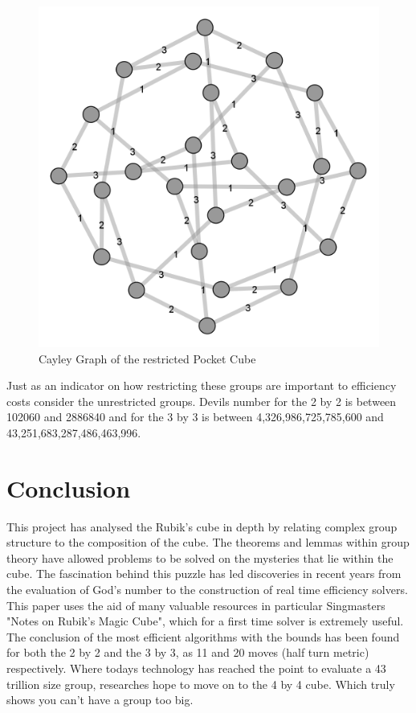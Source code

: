 \documentclass{article}
\newcounter{theo}[section]\setcounter{theo}{0}
\newcounter{lem}[section]\setcounter{lem}{0}
\begin{document}
\begin{figure}[h]
\includegraphics[scale=.15]{DoubleTurn.png}
\caption{Cayley Graph of the restricted Pocket Cube}
\label{fig:doubleturn}
\end{figure}

Just as an indicator on how restricting these groups are important to efficiency costs consider the unrestricted groups. Devils number for the 2 by 2 is between 102060 and 2886840 and for the 3 by 3 is between 4,326,986,725,785,600 and 43,251,683,287,486,463,996.

\newpage

\section{Conclusion}

This project has analysed the Rubik's cube in depth by relating complex group structure to the composition of the cube. The theorems and lemmas within group theory have allowed problems to be solved on the mysteries that lie within the cube. The fascination behind this puzzle has led discoveries in recent years from the evaluation of God's number to the construction of real time efficiency solvers. This paper uses the aid of many valuable resources in particular Singmasters "Notes on Rubik's Magic Cube", which for a first time solver is extremely useful. The conclusion of the most efficient algorithms with the bounds has been found for both the 2 by 2 and the 3 by 3, as 11 and 20 moves (half turn metric) respectively. Where todays technology has reached the point to evaluate a 43 trillion size group, researches hope to move on to the 4 by 4 cube. Which truly shows you can't have a group too big.
\end{document}
